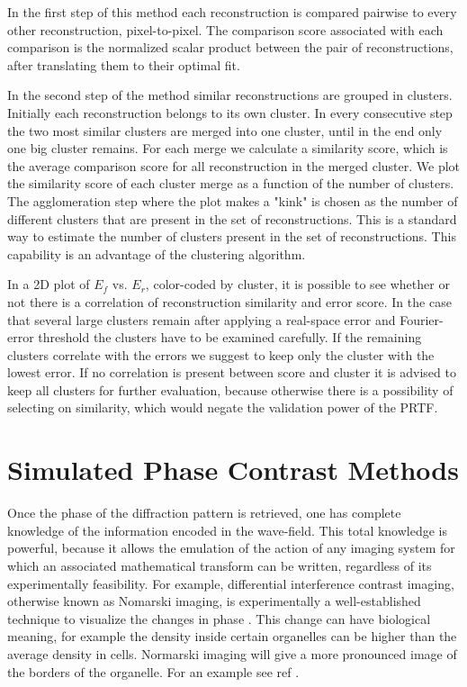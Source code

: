 In the first step of this method each reconstruction is compared pairwise to every other reconstruction, pixel-to-pixel. The comparison score associated with each comparison is the normalized scalar product between the pair of reconstructions, after translating them to their optimal fit. 

In the second step of the method similar reconstructions are grouped in clusters. Initially each reconstruction belongs to its own cluster. In every consecutive step the two most similar clusters are merged into one cluster, until in the end only one big cluster remains. For each merge we calculate a similarity score, which is the average comparison score for all reconstruction in the merged cluster. We plot the similarity score of each cluster merge as a function of the number of clusters. The agglomeration step where the plot makes a "kink" is chosen as the number of different clusters that are present in the set of reconstructions. This is a standard way to estimate the number of clusters present in the set of reconstructions. This capability is an advantage of the  clustering algorithm. 

In a 2D plot of $E_f$ vs. $E_r$, color-coded by cluster, it is possible to see whether or not there is a correlation of reconstruction similarity and error score.  In the case that several large clusters remain after applying a real-space error and Fourier-error threshold the clusters have to be examined carefully. If the remaining clusters correlate with the errors we suggest to keep only the cluster with the lowest error. If no correlation is present between score and cluster it is advised to keep all clusters for further evaluation, because otherwise there is a possibility of selecting on similarity, which would negate the validation power of the PRTF.

 
\section{Simulated Phase Contrast Methods}
Once the phase of the diffraction pattern is retrieved, one has complete knowledge of the information encoded in the  wave-field. This total knowledge is powerful, because it allows the emulation of the action of any imaging system for which an associated mathematical transform can be written, regardless of its experimentally feasibility.
For example, differential interference contrast imaging, otherwise known as Nomarski imaging, is experimentally a well-established technique to visualize the changes in phase \cite{Nomarski1955}. This change can have biological meaning, for example the density inside certain organelles can be higher than the average density in cells. Normarski imaging will give a more pronounced image of the borders of the organelle. For an example see ref \cite{Barty1998}. 

